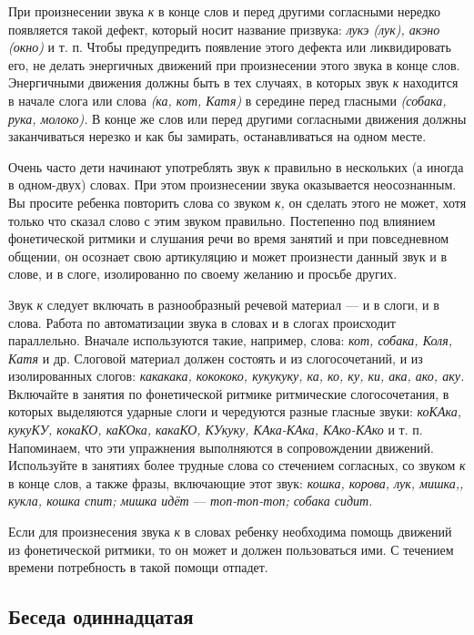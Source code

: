 \documentclass[a5paper]{book}
\renewcommand{\emph}[1]{\textit{#1}}
\begin{document}
При произнесении звука \emph{к} в конце слов и перед другими согласными
нередко появляется такой дефект, который носит название призвука:
\emph{лукэ (лук), акэно (окно)} и т. п. Чтобы предупредить появление
этого дефекта или ликвидировать его, не делать энергичных движений при
произнесении этого звука в конце слов. Энергичными движения должны быть
в тех случаях, в которых звук \emph{к} находится в начале слога или
слова \emph{(ка, кот, Катя)} в середине перед гласными \emph{(собака,
рука, молоко).} В конце же слов или перед другими согласными движения
должны заканчиваться нерезко и как бы замирать, останавливаться на одном
месте.

Очень часто дети начинают употреблять звук \emph{к} правильно в
нескольких (а иногда в одном-двух) словах. При этом произнесении звука
оказывается неосознанным. Вы просите ребенка повторить слова со звуком
\emph{к,} он сделать этого не может, хотя только что сказал слово с этим
звуком правильно. Постепенно под влиянием фонетической ритмики и
слушания речи во время занятий и при повседневном общении, он осознает
свою артикуляцию и может произнести данный звук и в слове, и в слоге,
изолированно по своему желанию и просьбе других.

Звук \emph{к} следует включать в разнообразный речевой материал --- и в
слоги, и в слова. Работа по автоматизации звука в словах и в слогах
происходит параллельно. Вначале используются такие, например, слова:
\emph{кот, собака, Коля, Катя} и др. Слоговой материал должен состоять и
из слогосочетаний, и из изолированных слогов: \emph{какакака, кокококо,
кукукуку, ка, ко, ку, ки, ака, ако, аку.} Включайте в занятия по
фонетической ритмике ритмические слогосочетания, в которых выделяются
ударные слоги и чередуются разные гласные звуки: \emph{коКАка, кукуКУ,
кокаКО, каКОка, какаКО, КУкуку, КАка-КАка, КАко-КАко} и т. п.
Напоминаем, что эти упражнения выполняются в сопровождении движений.
Используйте в занятиях более трудные слова со стечением согласных, со
звуком \emph{к} в конце слов, а также фразы, включающие этот звук:
\emph{кошка, корова, лук, мишка,, кукла, кошка спит; мишка идёт} ---
\emph{топ-топ-топ; собака сидит.}

Если для произнесения звука \emph{к} в словах ребенку необходима помощь
движений из фонетической ритмики, то он может и должен пользоваться ими.
С течением времени потребность в такой помощи отпадет.

\subsection*{Беседа одиннадцатая}
\end{document}
